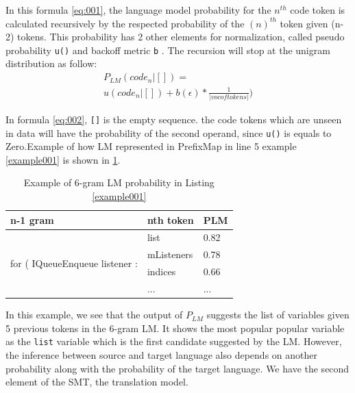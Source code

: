 In this formula \ref{eq:001}, the language model probability for the $n^{th}$ code token is calculated recursively by the respected probability of the $(n)^{th}$ token given (n-2) tokens. This probability has 2 other elements for normalization, called pseudo probability \texttt{u()} and backoff metric \texttt{b} \cite{037}. The recursion will stop at the unigram distribution as follow:
\noindent
\begin{equation*} 
\label{eq:002}
\begin{multlined}
 P_{LM}(code_{n}|[]) = \\ u(code_{n}|[])+b(\epsilon)*\frac{1}{|voc of tokens|})
 \end{multlined}
\end{equation*}

In formula \ref{eq:002}, \texttt{[]} is the empty sequence. the code tokens which are unseen in data will have the probability of the second operand, since \texttt{u()} is equals to Zero.Example of how LM represented in PrefixMap in line 5 example \ref{example001} is shown in \ref{tbl001}. 

\begin{table}[]

\begin{tabular}{|l|l|l|}
\hline
\textbf{n-1 gram}                               & \textbf{nth token} & \textbf{PLM} \\ \hline
\multirow{4}{*}{for ( IQueueEnqueue listener :} & list                  & 0.82         \\ \cline{2-3} 
                                                & mListeners         & 0.78         \\ \cline{2-3} 
                                                & indices              & 0.66         \\ \cline{2-3} 
                                                & ...                & ...          \\ \hline
\end{tabular}
\caption{Example of 6-gram LM probability in Listing \ref{example001} }
\label{tbl001}
\end{table}

In this example, we see that the output of $P_{LM}$ suggests the list of variables given 5 previous tokens in the 6-gram LM. It shows the most popular popular variable as the \texttt{list} variable which is the first candidate suggested by the LM. However, the inference between source and target language also depends on another probability along with the probability of the target language. We have the second element of the SMT, the translation model.

